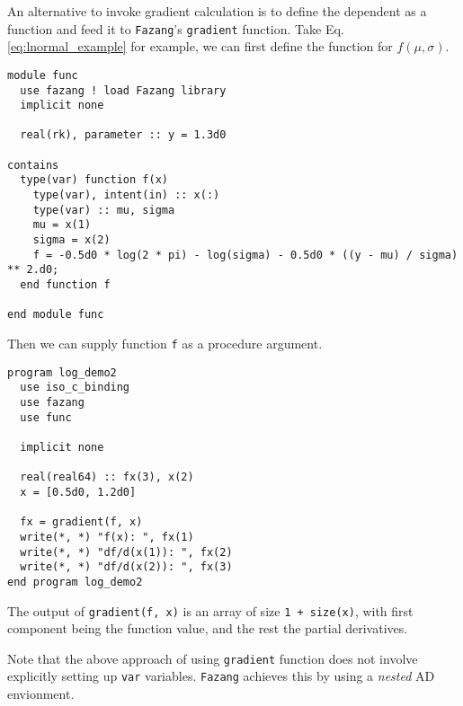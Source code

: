 \documentclass[12pt, reqno, oneside]{amsbook}
\begin{document}
An alternative to invoke gradient calculation is to define the
dependent as a function and feed it to \texttt{Fazang}'s \texttt{gradient}
function. Take Eq.\eqref{eq:lnormal_example} for example, we can first
define the function for \(f(\mu, \sigma)\).
\begin{verbatim}
module func
  use fazang ! load Fazang library
  implicit none

  real(rk), parameter :: y = 1.3d0

contains
  type(var) function f(x)
    type(var), intent(in) :: x(:)
    type(var) :: mu, sigma
    mu = x(1)
    sigma = x(2)
    f = -0.5d0 * log(2 * pi) - log(sigma) - 0.5d0 * ((y - mu) / sigma) ** 2.d0;
  end function f

end module func
\end{verbatim}
Then we can supply function \texttt{f} as a procedure argument.
\begin{verbatim}
program log_demo2
  use iso_c_binding
  use fazang
  use func

  implicit none

  real(real64) :: fx(3), x(2)
  x = [0.5d0, 1.2d0]

  fx = gradient(f, x)
  write(*, *) "f(x): ", fx(1)
  write(*, *) "df/d(x(1)): ", fx(2)
  write(*, *) "df/d(x(2)): ", fx(3)
end program log_demo2
\end{verbatim}
The output of \texttt{gradient(f, x)} is an array of size \texttt{1 + size(x)}, with
first component being the function value, and the rest the partial
derivatives.

Note that the above approach of using \texttt{gradient} function does not
involve explicitly setting up \texttt{var} variables. \texttt{Fazang} achieves this
by using a \emph{nested} AD envionment.
\end{document}
